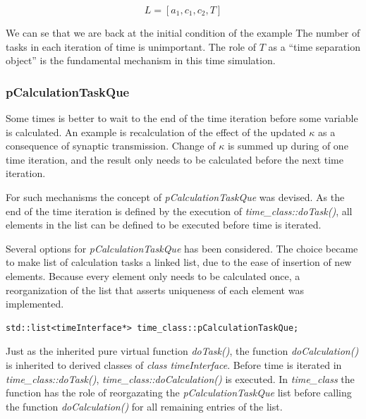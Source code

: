 \begin{equation}
	\nonumber
	L = [a_1, c_1, c_2, T ]
\end{equation}

We can se that we are back at the initial condition of the example
The number of tasks in each iteration of time is unimportant. 
The role of $T$ as a ``time separation object'' is the fundamental mechanism in this time simulation.




\subsubsection{pCalculationTaskQue}
\label{ssecCalcultaionTaskQue} %
Some times is better to wait to the end of the time iteration before some variable is calculated.  %
An example is recalculation of the effect of the updated $\kappa$ as a consequence of synaptic transmission. 
Change of $\kappa$ is summed up during of one time iteration, and the result only needs to be calculated before the next time iteration.

For such mechanisms the concept of \emph{pCalculationTaskQue} was devised.
As the end of the time iteration is defined by the execution of \emph{time\_class::doTask()}, all elements in the list can be defined to be executed before time is iterated.

Several options for \emph{pCalculationTaskQue} has been considered.
The choice became to make list of calculation tasks a linked list, due to the ease of insertion of new elements.
Because every element only needs to be calculated once, a reorganization of the list that asserts uniqueness of each element was implemented.

\begin{lstlisting}
std::list<timeInterface*> time_class::pCalculationTaskQue;
\end{lstlisting}

Just as the inherited pure virtual function \emph{doTask()}, the function \emph{doCalculation()} is inherited to derived classes of \emph{class timeInterface}.
Before time is iterated in \emph{time\_class::doTask()}, \emph{time\_class::doCalculation()} is executed.
In \emph{time\_class} the function has the role of reorgazating the \emph{pCalculationTaskQue} list before calling the function \emph{doCalculation()} for all remaining entries of the list.

